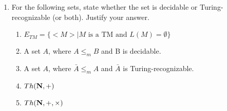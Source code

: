 \documentclass[11pt]{article}
\begin{document}
\begin{enumerate}
\item For the following sets, state whether the set is decidable or Turing-recognizable
	(or both).  Justify your answer.
	\begin{enumerate}
		\itemsep=0pt
		\item $E_{TM} = \{<\!\!\!M\!\!\!> \mid \mbox{$M$ is a TM and $L(M) = \emptyset$}\}$
		\item A set $A$, where $A \leq_m B$ and B is decidable.
		\item A set $A$, where $\bar{A} \leq_m A$ and $\bar{A}$ is Turing-recognizable.
		\item ${Th}({\bf N}, +)$
		\item ${Th}({\bf N}, +, \times)$			
	\end{enumerate}


\end{enumerate}
\end{document}
